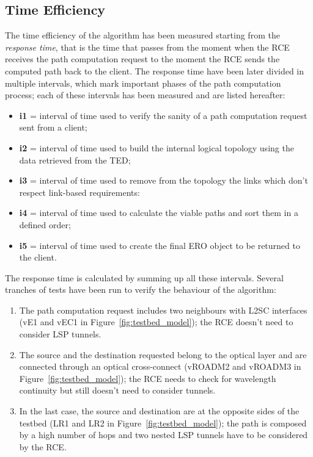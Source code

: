 \documentclass[10pt,a4paper]{report}
\begin{document}
\subsection{Time Efficiency}
The time efficiency of the algorithm has been measured starting from
the \textit{response time}, that is the time that passes from the
moment when the RCE receives the path computation request to the
moment the RCE sends the computed path back to the client. The
response time have been later divided in multiple intervals, which
mark important phases of the path computation process; each of these
intervals has been measured and are listed hereafter:
\begin{itemize}
\item \textbf{i1} = interval of time used to verify the sanity of a
  path computation request sent from a client;
\item \textbf{i2} = interval of time used to build the internal logical
  topology using the data retrieved from the TED;
\item \textbf{i3} = interval of time used to remove from the topology
  the links which don't respect link-based requirements:
\item \textbf{i4} = interval of time used to calculate the viable paths and
  sort them in a defined order;
\item \textbf{i5} = interval of time used to create the final ERO
  object to be returned to the client.
\end{itemize}
The response time is calculated by summing up all these
intervals. Several tranches of tests have been run to verify the
behaviour of the algorithm:
\begin{enumerate}
\item The path computation request includes two neighbours with L2SC
  interfaces (vE1 and vEC1 in Figure~\ref{fig:testbed_model}); the RCE
  doesn't need to consider LSP tunnels.
\item The source and the destination requested belong to the optical
  layer and are connected through an optical cross-connect (vROADM2
  and vROADM3 in Figure~\ref{fig:testbed_model}); the RCE needs to
  check for wavelength continuity but still doesn't need to consider
  tunnels.
\item In the last case, the source and destination are at the opposite
  sides of the testbed (LR1 and LR2 in
  Figure~\ref{fig:testbed_model}); the path is composed by a high
  number of hops and two nested LSP tunnels have to be considered by
  the RCE.
\end{enumerate}
\end{document}
